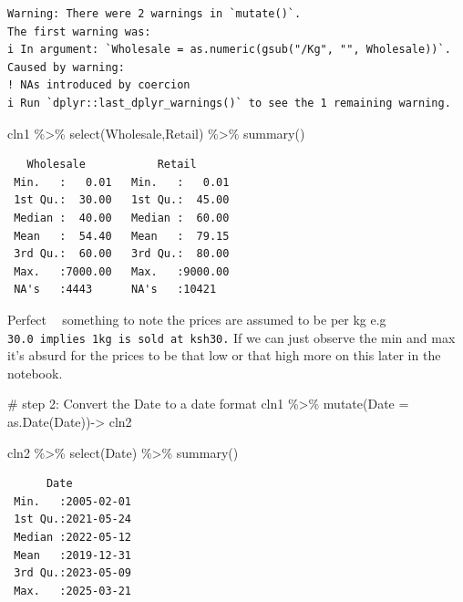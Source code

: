 \documentclass[
  letterpaper,
  DIV=11,
  numbers=noendperiod]{scrartcl}
\newenvironment{Shaded}{\begin{snugshade}}{\end{snugshade}}
\newcommand{\AttributeTok}[1]{\textcolor[rgb]{0.40,0.45,0.13}{#1}}
\newcommand{\CommentTok}[1]{\textcolor[rgb]{0.37,0.37,0.37}{#1}}
\newcommand{\FunctionTok}[1]{\textcolor[rgb]{0.28,0.35,0.67}{#1}}
\newcommand{\NormalTok}[1]{\textcolor[rgb]{0.00,0.23,0.31}{#1}}
\newcommand{\OtherTok}[1]{\textcolor[rgb]{0.00,0.23,0.31}{#1}}
\newcommand{\SpecialCharTok}[1]{\textcolor[rgb]{0.37,0.37,0.37}{#1}}
\begin{document}
\begin{verbatim}
Warning: There were 2 warnings in `mutate()`.
The first warning was:
i In argument: `Wholesale = as.numeric(gsub("/Kg", "", Wholesale))`.
Caused by warning:
! NAs introduced by coercion
i Run `dplyr::last_dplyr_warnings()` to see the 1 remaining warning.
\end{verbatim}

\begin{Shaded}
\begin{Highlighting}[]
\NormalTok{cln1 }\SpecialCharTok{\%\textgreater{}\%} \FunctionTok{select}\NormalTok{(Wholesale,Retail) }\SpecialCharTok{\%\textgreater{}\%} \FunctionTok{summary}\NormalTok{()}
\end{Highlighting}
\end{Shaded}

\begin{verbatim}
   Wholesale           Retail       
 Min.   :   0.01   Min.   :   0.01  
 1st Qu.:  30.00   1st Qu.:  45.00  
 Median :  40.00   Median :  60.00  
 Mean   :  54.40   Mean   :  79.15  
 3rd Qu.:  60.00   3rd Qu.:  80.00  
 Max.   :7000.00   Max.   :9000.00  
 NA's   :4443      NA's   :10421    
\end{verbatim}

Perfect 👌🏿 something to note the prices are assumed to be per kg e.g
\texttt{30.0\ implies\ 1kg\ is\ sold\ at\ ksh30.} If we can just observe
the min and max it's absurd for the prices to be that low or that high
more on this later in the notebook.

\begin{Shaded}
\begin{Highlighting}[]
\CommentTok{\# step 2: Convert the Date to a date format}
\NormalTok{cln1 }\SpecialCharTok{\%\textgreater{}\%} \FunctionTok{mutate}\NormalTok{(}\AttributeTok{Date =} \FunctionTok{as.Date}\NormalTok{(Date))}\OtherTok{{-}\textgreater{}}\NormalTok{ cln2}

\NormalTok{cln2 }\SpecialCharTok{\%\textgreater{}\%} \FunctionTok{select}\NormalTok{(Date) }\SpecialCharTok{\%\textgreater{}\%} \FunctionTok{summary}\NormalTok{()}
\end{Highlighting}
\end{Shaded}

\begin{verbatim}
      Date           
 Min.   :2005-02-01  
 1st Qu.:2021-05-24  
 Median :2022-05-12  
 Mean   :2019-12-31  
 3rd Qu.:2023-05-09  
 Max.   :2025-03-21  
\end{verbatim}
\end{document}
